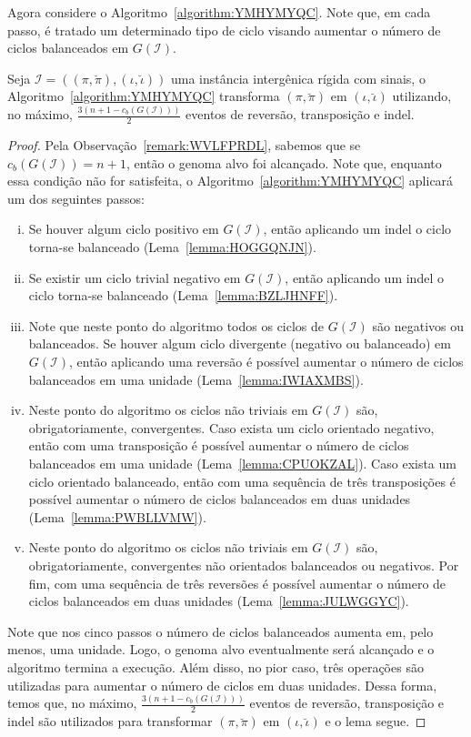 Agora considere o Algoritmo~\ref{algorithm:YMHYMYQC}. Note que, em cada passo, é tratado um determinado tipo de ciclo visando aumentar o número de ciclos balanceados em $G(\mathcal{I})$.



\begin{lemma}\label{lemma:TKRHFREQ}
Seja $\mathcal{I} = ((\pi,\breve\pi),(\iota,\breve\iota))$ uma instância intergênica rígida com sinais, o Algoritmo~\ref{algorithm:YMHYMYQC} transforma $(\pi,\breve\pi)$ em $(\iota,\breve\iota)$ utilizando, no máximo, $\frac{3(n+1 - c_b(G(\mathcal{I})))}{2}$ eventos de reversão, transposição e indel.
\end{lemma}
\begin{proof}
Pela Observação~\ref{remark:WVLFPRDL}, sabemos que se $c_b(G(\mathcal{I})) = {n + 1}$, então o genoma alvo foi alcançado. Note que, enquanto essa condição não for satisfeita, o Algoritmo~\ref{algorithm:YMHYMYQC} aplicará um dos seguintes passos: 

\begin{enumerate}[i.]
  \item Se houver algum ciclo positivo em $G(\mathcal{I})$, então aplicando um indel o ciclo torna-se balanceado (Lema~\ref{lemma:HOGGQNJN}).
  \item Se existir um ciclo trivial negativo em $G(\mathcal{I})$, então aplicando um indel o ciclo torna-se balanceado (Lema~\ref{lemma:BZLJHNFF}).
  \item Note que neste ponto do algoritmo todos os ciclos de $G(\mathcal{I})$ são negativos ou balanceados. Se houver algum ciclo divergente (negativo ou balanceado) em $G(\mathcal{I})$, então aplicando uma reversão é possível aumentar o número de ciclos balanceados em uma unidade (Lema~\ref{lemma:IWIAXMBS}).
  \item Neste ponto do algoritmo os ciclos não triviais em $G(\mathcal{I})$ são, obrigatoriamente, convergentes. Caso exista um ciclo orientado negativo, então com uma transposição é possível aumentar o número de ciclos balanceados em uma unidade (Lema~\ref{lemma:CPUOKZAL}). Caso exista um ciclo orientado balanceado, então com uma sequência de três transposições é possível aumentar o número de ciclos balanceados em duas unidades (Lema~\ref{lemma:PWBLLVMW}).
  \item Neste ponto do algoritmo os ciclos não triviais em $G(\mathcal{I})$ são, obrigatoriamente, convergentes não orientados balanceados ou negativos. Por fim, com uma sequência de três reversões é possível aumentar o número de ciclos balanceados em duas unidades (Lema~\ref{lemma:JULWGGYC}).
\end{enumerate}

Note que nos cinco passos o número de ciclos balanceados aumenta em, pelo menos, uma unidade. Logo, o genoma alvo eventualmente será alcançado e o algoritmo termina a execução. Além disso, no pior caso, três operações são utilizadas para aumentar o número de ciclos em duas unidades. Dessa forma, temos que, no máximo, $\frac{3(n+1 - c_b(G(\mathcal{I})))}{2}$ eventos de reversão, transposição e indel são utilizados para transformar $(\pi,\breve\pi)$ em $(\iota,\breve\iota)$ e o lema segue.
\end{proof}

